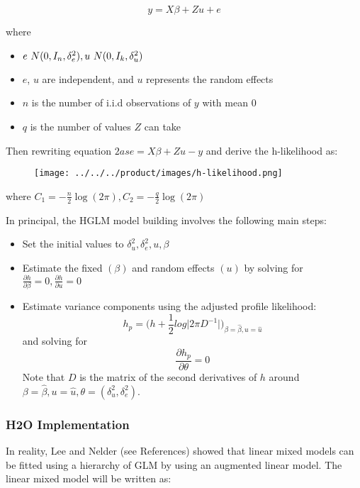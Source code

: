 $$y = X\beta + Zu + e$$

where

    \begin{itemize}
    \item  $e \text ~ N(0, I_n, \delta_e^2), u \text ~ N(0, I_k, \delta_u^2)$
    \item  $e$, $u$ are independent, and $u$ represents the random effects
    \item $n$ is the number of i.i.d observations of $y$ with mean $0$
    \item $q$ is the number of values $Z$ can take
    \end{itemize}
    
Then rewriting equation $2 as e = X\beta + Zu - y$ and derive the h-likelihood as:

\begin{figure}[H]
\centering
\texttt{[image: ../../../product/images/h-likelihood.png]}
\end{figure}

where $C_1 = - \frac{n}{2} \log(2\pi), C_2 = - \frac{q}{2} \log(2\pi)$

In principal, the HGLM model building involves the following main steps:

\begin{itemize}
    \item Set the initial values to $\delta_u^2, \delta_e^2, u, \beta$
    \item Estimate the fixed $(\beta)$ and random effects $(u)$ by solving for $\frac{\partial h}{\partial \beta} = 0, \frac{\partial h}{\partial u} = 0$
    \item Estimate variance components using the adjusted profile likelihood:
        $$h_p = \big(h + \frac{1}{2} log \big| 2 \pi D^{-1}\big| \big)_{\beta=\hat \beta, u=\hat u}$$
        and solving for
        $$\frac{\partial h_p}{\partial \theta} = 0$$
        Note that $D$ is the matrix of the second derivatives of $h$ around $\beta = \hat \beta, u = \hat u, \theta = (\delta_u^2, \delta_e^2)$.  
\end{itemize}

\subsubsection{H2O Implementation}

In reality, Lee and Nelder (see References) showed that linear mixed models can be fitted using a hierarchy of GLM by using an augmented linear model. The linear mixed model will be written as:

